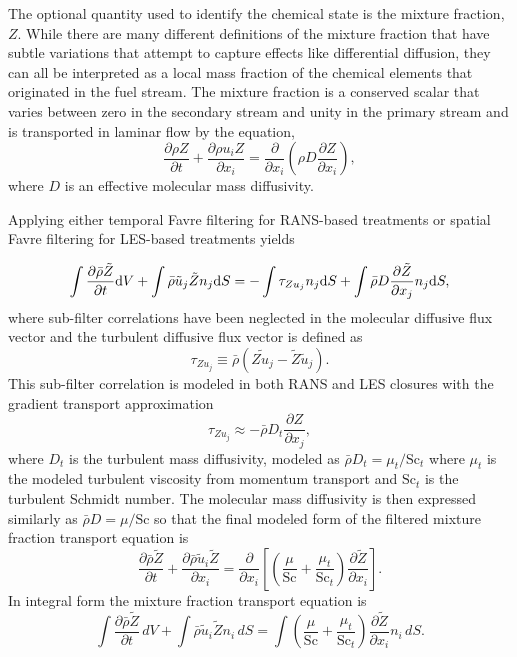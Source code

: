 The optional quantity used to identify the chemical state is the mixture 
fraction, $Z$.  While there are many 
different definitions of the mixture fraction that have subtle variations
that attempt to capture effects like differential diffusion, they can all 
be interpreted as a local mass fraction of the chemical elements that
originated in the fuel stream.  The mixture fraction is a
conserved scalar that varies between zero in the secondary stream and unity in the
primary stream and is transported in laminar flow by the equation,
%
\begin{equation}
\frac{\partial \rho Z}{\partial t}
  + \frac{ \partial \rho u_i Z }{ \partial x_i}
  = \frac{\partial}{\partial x_i} \left( \rho D \frac{\partial Z}{\partial x_i}
    \right),  \label{eqn:lam_Z}
\end{equation}
%
where $D$ is an effective molecular mass diffusivity.

Applying either temporal Favre filtering for RANS-based treatments or 
spatial Favre filtering for LES-based treatments yields


\begin{equation}
\int \frac{\partial \bar{\rho} \tilde{Z}}{\partial t} {\rm d}V
  + \int \bar{\rho} \tilde{u}_j \tilde{Z} n_j {\rm d}S
  = - \int \tau_{Zu_j} n_j {\rm d}S + \int \bar{\rho} D \frac{\partial \tilde{Z}}{\partial x_j} n_j {\rm d}S,  \label{eqn:turb_Z}
\end{equation}
%
where sub-filter correlations have been neglected in the molecular diffusive
flux vector and the turbulent diffusive flux vector is defined as
%
\begin{equation}
\tau_{Z u_j} \equiv \bar{\rho} \left( \widetilde{Z u_j} -
  \tilde{Z} \tilde{u}_j \right).
\end{equation}
%
This sub-filter correlation is modeled in
both RANS and LES closures with the gradient transport approximation
%
\begin{equation}
\tau_{Z u_j} \approx - \bar{\rho} D_t \frac{\partial Z}{\partial x_j},
\end{equation}
%
where $D_t$ is the turbulent mass diffusivity, modeled as $\bar{\rho} D_t =
\mu_t / \mathrm{Sc}_t$ where $\mu_t$ is the modeled turbulent viscosity
from momentum transport and $\mathrm{Sc}_t$ is the turbulent Schmidt number.
The molecular mass
diffusivity is then expressed similarly as $\bar{\rho} D = \mu / \mathrm{Sc}$
so that the final modeled form of the filtered mixture fraction transport
equation is
%
\begin{equation}
\frac{\partial \bar{\rho} \tilde{Z}}{\partial t}
  + \frac{ \partial \bar{\rho} \tilde{u}_i \tilde{Z} }{ \partial x_i}
  = \frac{\partial}{\partial x_i} 
    \left[ \left( \frac{\mu}{\mathrm{Sc}} + \frac{\mu_t}{\mathrm{Sc}_t} \right)
    \frac{\partial \tilde{Z}}{\partial x_i} \right].
\end{equation}
%
In integral form the mixture fraction transport equation is
%
\begin{equation}
\int \frac{\partial \bar{\rho} \tilde{Z}}{\partial t}\, dV
  + \int \bar{\rho} \tilde{u}_i \tilde{Z} n_i\, dS
  = \int \left( \frac{\mu}{\mathrm{Sc}} + \frac{\mu_t}{\mathrm{Sc}_t} \right)
    \frac{\partial \tilde{Z}}{\partial x_i} n_i\, dS.
\end{equation}

